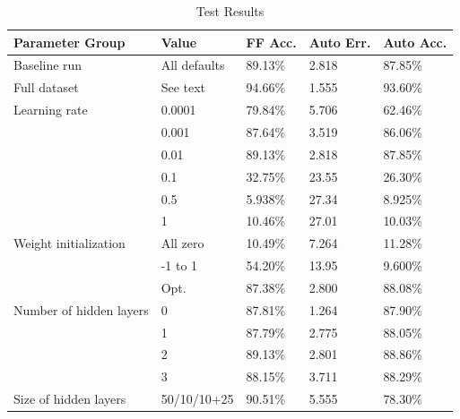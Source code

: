 \documentclass[english]{tktltiki}
\begin{document}
\begin{table}[]
\centering
\caption{Test Results}
\label{test-table}
\begin{tabular}{@{}lllll@{}}
\toprule
\textbf{Parameter Group} & \textbf{Value}    & \textbf{FF Acc.} & \textbf{Auto Err.} & \textbf{Auto Acc.} \\ \midrule
Baseline run             & All defaults      & 89.13\%          & 2.818              & 87.85\%            \\
Full dataset             & See text		     & 94.66\%          & 1.555              & 93.60\%            \\
Learning rate            & 0.0001            & 79.84\%          & 5.706              & 62.46\%            \\
                         & 0.001             & 87.64\%          & 3.519              & 86.06\%            \\
                         & 0.01              & 89.13\%          & 2.818              & 87.85\%            \\
                         & 0.1               & 32.75\%          & 23.55              & 26.30\%             \\
                         & 0.5               & 5.938\%          & 27.34              & 8.925\%            \\
                         & 1                 & 10.46\%          & 27.01              & 10.03\%            \\
Weight initialization    & All zero          & 10.49\%          & 7.264              & 11.28\%            \\
                         & -1 to 1           & 54.20\%          & 13.95              & 9.600\%            \\
                         & Opt.              & 87.38\%          & 2.800              & 88.08\%            \\
Number of hidden layers  & 0                 & 87.81\%          & 1.264              & 87.90\%            \\
                         & 1                 & 87.79\%          & 2.775              & 88.05\%            \\
                         & 2                 & 89.13\%          & 2.801              & 88.86\%            \\
                         & 3                 & 88.15\%          & 3.711              & 88.29\%            \\
Size of hidden layers    & 50/10/10+25       & 90.51\%          & 5.555              & 78.30\%            \\

\end{tabular}
\end{table}
\end{document}
